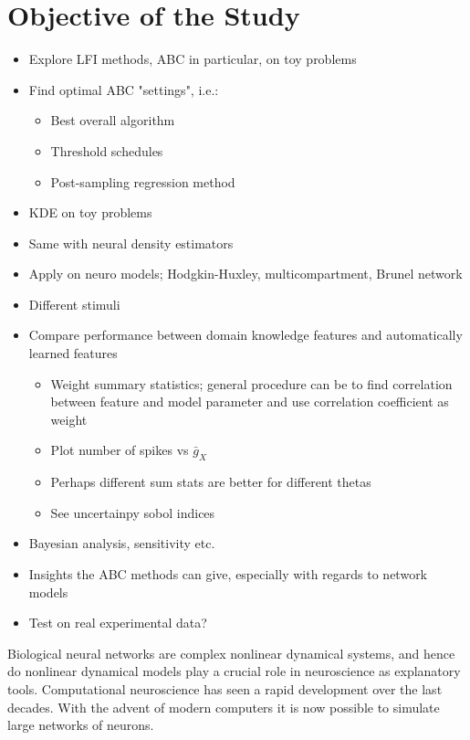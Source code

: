 \section{Objective of the Study}

\begin{itemize}
    \item Explore LFI methods, ABC in particular, on toy problems
    \item Find optimal ABC "settings", i.e.: 
    \begin{itemize}
        \item Best overall algorithm 
        \item Threshold schedules
        \item Post-sampling regression method 
    \end{itemize}
    \item KDE on toy problems
    \item Same with neural density estimators 
    \item Apply on neuro models; Hodgkin-Huxley, multicompartment, Brunel network
    \item Different stimuli 
    \item Compare performance between domain knowledge features and automatically learned features 
    \begin{itemize}
        \item Weight summary statistics; general procedure can be to find correlation between feature and model parameter and use correlation coefficient as weight
        \item Plot number of spikes vs $\bar{g}_X$
        \item Perhaps different sum stats are better for different thetas
        \item See uncertainpy sobol indices
    \end{itemize}
    \item Bayesian analysis, sensitivity etc. 
    \item Insights the ABC methods can give, especially with regards to network models
    \item Test on real experimental data?
\end{itemize}

Biological neural networks are complex nonlinear dynamical systems, and hence do nonlinear dynamical models play a crucial role in neuroscience as explanatory tools. Computational neuroscience has seen a rapid development over the last decades. With the advent of modern computers it is now possible to simulate large networks of neurons. 

